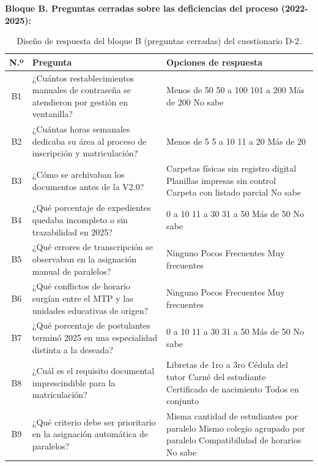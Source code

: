 \noindent\textbf{Bloque B. Preguntas cerradas sobre las deficiencias del proceso (2022-2025):}

\begin{table}[htbp]
    \centering
    \caption{Diseño de respuesta del bloque B (preguntas cerradas) del cuestionario D-2.}
    \label{tab:d2_cerradas}
    \begin{tabularx}{\textwidth}{c L L}
        \toprule
        \textbf{N.º} & \textbf{Pregunta} & \textbf{Opciones de respuesta} \\
        \midrule
        B1 & ¿Cuántos restablecimientos manuales de contraseña se atendieron por gestión en ventanilla? & \casilla{} Menos de 50 \quad \casilla{} 50 a 100 \quad \casilla{} 101 a 200 \quad \casilla{} Más de 200 \quad \casilla{} No sabe \\
        B2 & ¿Cuántas horas semanales dedicaba su área al proceso de inscripción y matriculación? & \casilla{} Menos de 5 \quad \casilla{} 5 a 10 \quad \casilla{} 11 a 20 \quad \casilla{} Más de 20 \\
        B3 & ¿Cómo se archivaban los documentos antes de la V2.0? & \casilla{} Carpetas físicas sin registro digital \quad \casilla{} Planillas impresas sin control \quad \casilla{} Carpeta con listado parcial \quad \casilla{} No sabe \\
        B4 & ¿Qué porcentaje de expedientes quedaba incompleto o sin trazabilidad en 2025? & \casilla{} 0 a 10 \quad \casilla{} 11 a 30 \quad \casilla{} 31 a 50 \quad \casilla{} Más de 50 \quad \casilla{} No sabe \\
        B5 & ¿Qué errores de transcripción se observaban en la asignación manual de paralelos? & \casilla{} Ninguno \quad \casilla{} Pocos \quad \casilla{} Frecuentes \quad \casilla{} Muy frecuentes \\
        B6 & ¿Qué conflictos de horario surgían entre el MTP y las unidades educativas de origen? & \casilla{} Ninguno \quad \casilla{} Pocos \quad \casilla{} Frecuentes \quad \casilla{} Muy frecuentes \\
        B7 & ¿Qué porcentaje de postulantes terminó 2025 en una especialidad distinta a la deseada? & \casilla{} 0 a 10 \quad \casilla{} 11 a 30 \quad \casilla{} 31 a 50 \quad \casilla{} Más de 50 \quad \casilla{} No sabe \\
        B8 & ¿Cuál es el requisito documental imprescindible para la matriculación? & \casilla{} Libretas de 1ro a 3ro \quad \casilla{} Cédula del tutor \quad \casilla{} Carné del estudiante \quad \casilla{} Certificado de nacimiento \quad \casilla{} Todos en conjunto \\
        B9 & ¿Qué criterio debe ser prioritario en la asignación automática de paralelos? & \casilla{} Misma cantidad de estudiantes por paralelo \quad \casilla{} Mismo colegio agrupado por paralelo \quad \casilla{} Compatibilidad de horarios \quad \casilla{} No sabe \\
        \bottomrule
    \end{tabularx}
\end{table}

